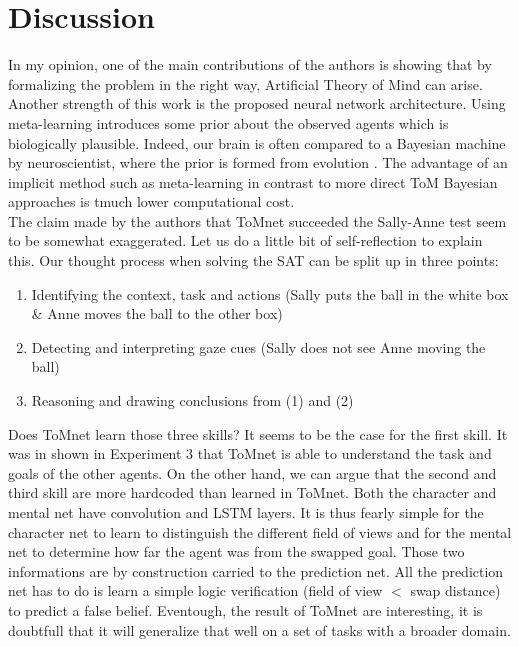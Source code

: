 \documentclass[twocolumn,superscriptaddress,aps]{revtex4-1}
\begin{document}
\section{Discussion}

\noindent In my opinion, one of the main contributions of the authors is showing that by formalizing the problem in the right way, Artificial Theory of Mind can arise. Another strength of this work is the proposed neural network architecture. Using meta-learning introduces some prior about the observed agents which is biologically plausible. Indeed, our brain is often compared to a Bayesian machine by neuroscientist, where the prior is formed from evolution \cite{bayesian-brain}. The advantage of an implicit method such as meta-learning in contrast to more direct ToM Bayesian approaches \cite{dragan, nature} is tmuch lower computational cost.\\

\indent The claim made by the authors that ToMnet succeeded the Sally-Anne test seem to be somewhat exaggerated. Let us do a little bit of self-reflection to explain this. Our thought process when solving the SAT can be split up in three points:
\begin{enumerate}[label=(\arabic*)]
\item Identifying the context, task and actions (Sally puts the ball in the white box \& Anne moves the ball to the other box)
\item Detecting and interpreting gaze cues (Sally does not see Anne moving the ball)
\item Reasoning and drawing conclusions from (1) and (2)
\end{enumerate}
Does ToMnet learn those three skills? It seems to be the case for the first skill. It was in shown in Experiment 3 that ToMnet is able to understand the task and goals of the other agents. On the other hand, we can argue that the second and third skill are more hardcoded than learned in ToMnet. Both the character and mental net have convolution and LSTM layers. It is thus fearly simple for the character net to learn to distinguish the different field of views and for the mental net to determine how far the agent was from the swapped goal. Those two informations are by construction carried to the prediction net. All the prediction net has to do is learn a simple logic verification (field of view $<$ swap distance) to predict a false belief. Eventough, the result of ToMnet are interesting, it is doubtfull that it will generalize that well on a set of tasks with a broader domain.\\
\end{document}
